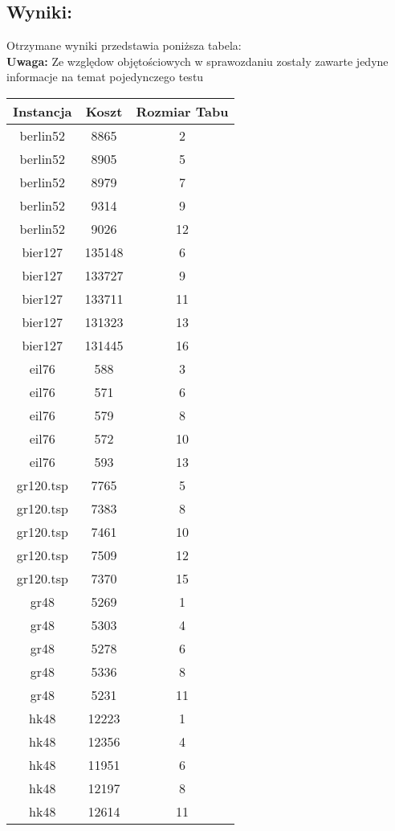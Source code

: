   \subsection{Wyniki: }
  Otrzymane wyniki przedstawia poniższa tabela: \\
  \textbf{Uwaga:} Ze względow objętościowych w sprawozdaniu zostały zawarte jedyne informacje na temat pojedynczego testu
  \begin{table}[H]
    \centering
    \begin{tabular}{||c c c||} 
     \hline
     Instancja & Koszt & Rozmiar Tabu\\ [0.5ex] 
     \hline\hline
     berlin52 &	8865	& 2 \\
     berlin52	& 8905	& 5 \\
     berlin52	& 8979	& 7 \\
     berlin52 &	9314	& 9 \\
     berlin52 &	9026	& 12 \\ 
     bier127 & 135148  & 6 \\
     bier127 & 133727 & 9 \\
     bier127 & 133711 & 11\\
     bier127 & 131323 & 13\\
     bier127 & 131445 & 16\\
     eil76 & 588 & 3\\
     eil76 & 571 & 6\\
     eil76 & 579 & 8\\
     eil76 & 572 & 10\\
     eil76 & 593 & 13\\
     gr120.tsp & 7765  & 5\\ 
     gr120.tsp & 7383 & 8\\ 
     gr120.tsp & 7461 & 10\\ 
     gr120.tsp & 7509 & 12\\ 
     gr120.tsp & 7370 & 15\\ 
     gr48 & 5269 & 1 \\
     gr48 & 5303 & 4 \\
     gr48 & 5278 & 6 \\
     gr48 & 5336 & 8 \\
     gr48 & 5231 & 11 \\
     hk48 & 12223 & 1 \\
     hk48 & 12356 & 4 \\
     hk48 & 11951 & 6 \\
     hk48 & 12197 & 8 \\
     hk48 & 12614 & 11 \\

\end{tabular}
\end{table}
